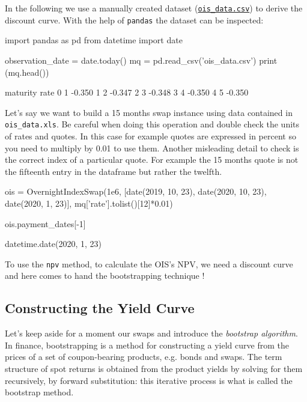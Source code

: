 In the following we use a manually created dataset (\href{https://raw.githubusercontent.com/matteosan1/finance_course/develop/libro/input_files/ois_quotes.csv}{\texttt{ois\_data.csv}}) to derive the discount curve. With the help of \texttt{pandas} the dataset can be inspected:

\begin{ipython}
import pandas as pd
from datetime import date

observation_date = date.today()
mq = pd.read_csv('ois_data.csv')
print (mq.head())
\end{ipython}
\begin{ioutput}
 maturity   rate
0       1 -0.350
1       2 -0.347
2       3 -0.348
3       4 -0.350
4       5 -0.350
\end{ioutput}

Let's say we want to build a 15 months swap instance using data contained in \texttt{ois\_data.xls}. Be careful when doing this
operation and double check the units of rates and quotes. In this case for example quotes are expressed in percent so you need to multiply by 0.01 to use them. Another misleading detail to check is the correct index of a particular quote. For example the 15 months quote is not the fifteenth entry in the dataframe but rather the twelfth.

\begin{ipython}
ois = OvernightIndexSwap(1e6,
                         [date(2019, 10, 23), date(2020, 10, 23),
                          date(2020, 1, 23)],
                         mq['rate'].tolist()[12]*0.01)

ois.payment_dates[-1]
\end{ipython}
\begin{ioutput}
datetime.date(2020, 1, 23)
\end{ioutput}

To use the \texttt{npv} method, to calculate the OIS's NPV, we need a discount curve and here comes to hand the bootstrapping technique !

\subsection{Constructing the Yield Curve}
\label{the-bootstrapping-technique}

Let's keep aside for a moment our swaps and introduce the \emph{bootstrap algorithm}. In finance, bootstrapping is a method for constructing a yield curve from the prices of a set of coupon-bearing products, e.g. bonds and swaps. The term structure of spot returns is obtained from the product yields by solving for them recursively, by forward substitution: this iterative process is what is called the bootstrap method. 

